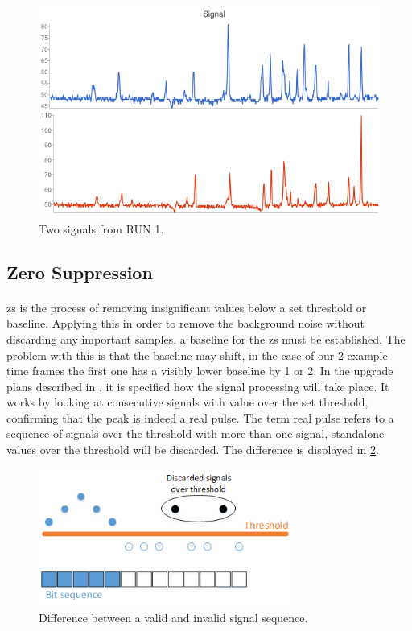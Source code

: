 \documentclass[a4paper, 12pt, openright, twoside]{report}
\begin{document}
\begin{figure}[t]
	\centering
		\includegraphics[width=1.0\textwidth]{images/signal.png}
		\caption{Two signals from RUN 1.}
		\label{fig:signal}
\end{figure}

\subsection{Zero Suppression} 
\label{subsec:zs}

\paragraph{}
\gls{zs} is the process of removing insignificant values below a set threshold or baseline\cite{zerosuppression}.
Applying this in order to remove the background noise without discarding any important samples, a baseline for the \gls{zs} must be established.
The problem with this is that the baseline may shift, in the case of our 2 example time frames the first one has a visibly lower baseline by 1 or 2.
In the upgrade plans described in \cite{tdr-015}, it is specified how the signal processing will take place.
It works by looking at consecutive signals with value over the set threshold, confirming that the peak is indeed a real pulse.
The term real pulse refers to a sequence of signals over the threshold with more than one signal, standalone values over the threshold will be discarded.
The difference is displayed in \ref{fig:minseq}.

\begin{figure}[h!]
	\centering
		\includegraphics[width=0.75\textwidth]{images/minseq.png}
		\caption{Difference between a valid and invalid signal sequence.}
		\label{fig:minseq}
\end{figure}
\end{document}
